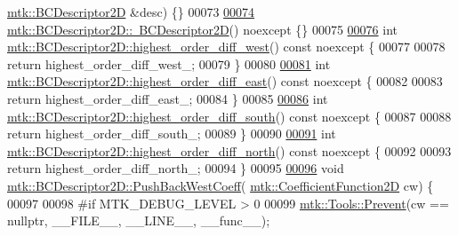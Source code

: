 \begin{DoxyCode}
      \hyperlink{classmtk_1_1BCDescriptor2D}{mtk::BCDescriptor2D} &desc) \{\}
00073 
\hypertarget{mtk__bc__descriptor__2d_8cc_source_l00074}{}\hyperlink{classmtk_1_1BCDescriptor2D_ae14e62548a8bc080d576fff6937c546b}{00074} \hyperlink{classmtk_1_1BCDescriptor2D_ae14e62548a8bc080d576fff6937c546b}{mtk::BCDescriptor2D::~BCDescriptor2D}() noexcept \{\}
00075 
\hypertarget{mtk__bc__descriptor__2d_8cc_source_l00076}{}\hyperlink{classmtk_1_1BCDescriptor2D_a0fa469ddf6ff76e2858d6d3b76cc8b6f}{00076} \textcolor{keywordtype}{int} \hyperlink{classmtk_1_1BCDescriptor2D_a0fa469ddf6ff76e2858d6d3b76cc8b6f}{mtk::BCDescriptor2D::highest\_order\_diff\_west}() const 
      noexcept \{
00077 
00078   \textcolor{keywordflow}{return} highest\_order\_diff\_west\_;
00079 \}
00080 
\hypertarget{mtk__bc__descriptor__2d_8cc_source_l00081}{}\hyperlink{classmtk_1_1BCDescriptor2D_a5a9b80a2e9e579b05d9f3589d80448b6}{00081} \textcolor{keywordtype}{int} \hyperlink{classmtk_1_1BCDescriptor2D_a5a9b80a2e9e579b05d9f3589d80448b6}{mtk::BCDescriptor2D::highest\_order\_diff\_east}() const 
      noexcept \{
00082 
00083   \textcolor{keywordflow}{return} highest\_order\_diff\_east\_;
00084 \}
00085 
\hypertarget{mtk__bc__descriptor__2d_8cc_source_l00086}{}\hyperlink{classmtk_1_1BCDescriptor2D_a463d909f6014e7f01b33171a06d7b400}{00086} \textcolor{keywordtype}{int} \hyperlink{classmtk_1_1BCDescriptor2D_a463d909f6014e7f01b33171a06d7b400}{mtk::BCDescriptor2D::highest\_order\_diff\_south}() const 
      noexcept \{
00087 
00088   \textcolor{keywordflow}{return} highest\_order\_diff\_south\_;
00089 \}
00090 
\hypertarget{mtk__bc__descriptor__2d_8cc_source_l00091}{}\hyperlink{classmtk_1_1BCDescriptor2D_a87c5f2449247d65ea07784ba2ec61bc7}{00091} \textcolor{keywordtype}{int} \hyperlink{classmtk_1_1BCDescriptor2D_a87c5f2449247d65ea07784ba2ec61bc7}{mtk::BCDescriptor2D::highest\_order\_diff\_north}() const 
      noexcept \{
00092 
00093   \textcolor{keywordflow}{return} highest\_order\_diff\_north\_;
00094 \}
00095 
\hypertarget{mtk__bc__descriptor__2d_8cc_source_l00096}{}\hyperlink{classmtk_1_1BCDescriptor2D_a3da32ba89cfb15032bb1156394bad98c}{00096} \textcolor{keywordtype}{void} \hyperlink{classmtk_1_1BCDescriptor2D_a3da32ba89cfb15032bb1156394bad98c}{mtk::BCDescriptor2D::PushBackWestCoeff}(
      \hyperlink{group__c07-mim__ops_gad9e1c0ace886b0029aefffa5f320e852}{mtk::CoefficientFunction2D} cw) \{
00097 
00098 \textcolor{preprocessor}{  #if MTK\_DEBUG\_LEVEL > 0}
00099   \hyperlink{classmtk_1_1Tools_a332324c6f25e66be9dff48c5987a3b9f}{mtk::Tools::Prevent}(cw == \textcolor{keyword}{nullptr}, \_\_FILE\_\_, \_\_LINE\_\_, \_\_func\_\_);

\end{DoxyCode}
